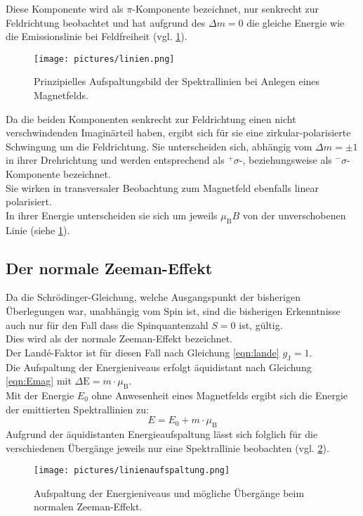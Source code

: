Diese Komponente wird als $\pi$-Komponente bezeichnet, nur senkrecht zur Feldrichtung beobachtet und hat aufgrund des $\Delta m=0$ die gleiche Energie wie die Emissionslinie bei Feldfreiheit (vgl. \ref{fig:linien}).\\
\begin{figure}
  \centering
  \texttt{[image: pictures/linien.png]}
  \caption{Prinzipielles Aufspaltungsbild der Spektrallinien bei Anlegen eines Magnetfelds.\cite{Anleitung}}
  \label{fig:linien}
\end{figure}
Da die beiden Komponenten senkrecht zur Feldrichtung einen nicht verschwindenden Imaginärteil haben, ergibt sich für sie eine zirkular-polarisierte Schwingung um die Feldrichtung. Sie unterscheiden sich, abhängig vom $\Delta m=\pm 1$ in ihrer Drehrichtung und werden entsprechend als $^{+}\sigma$-, beziehungsweise als $^{-}\sigma$-Komponente bezeichnet.\\
Sie wirken in transversaler Beobachtung zum Magnetfeld ebenfalls linear polarisiert.\\
In ihrer Energie unterscheiden sie sich um jeweils $\mu_{\mathrm{B}}B$ von der unverschobenen Linie (siehe \ref{fig:linien}).\\

\subsection{Der normale Zeeman-Effekt}
Da die Schrödinger-Gleichung, welche Ausgangspunkt der bisherigen Überlegungen war, unabhängig vom Spin ist, sind die bisherigen Erkenntnisse auch nur für den Fall dass die Spinquantenzahl $S=0$ ist, gültig.\\
Dies wird als der normale Zeeman-Effekt bezeichnet.\\ Der Landé-Faktor ist für diesen Fall nach Gleichung \eqref{eqn:lande} $g_{\mathrm{J}}=1$.\\
Die Aufspaltung der Energieniveaus erfolgt äquidistant nach Gleichung \eqref{eqn:Emag} mit $\Delta \mathrm{E}=m\cdot \mu_{\mathrm{B}}$.\\
Mit der Energie $E_0$ ohne Anwesenheit eines Magnetfelds ergibt sich die Energie der emittierten Spektrallinien zu:
\begin{equation}
  E=E_0+ m\cdot \mu_{\mathrm{B}}
\end{equation}
Aufgrund der äquidistanten Energieaufspaltung lässt sich folglich für die verschiedenen Übergänge jeweils nur eine Spektrallinie beobachten (vgl. \ref{fig:normaler}).
\begin{figure}
  \centering
  \texttt{[image: pictures/linienaufspaltung.png]}
  \caption{Aufspaltung der Energieniveaus und mögliche Übergänge beim normalen Zeeman-Effekt.\cite{Anleitung}}
  \label{fig:normaler}
\end{figure}
